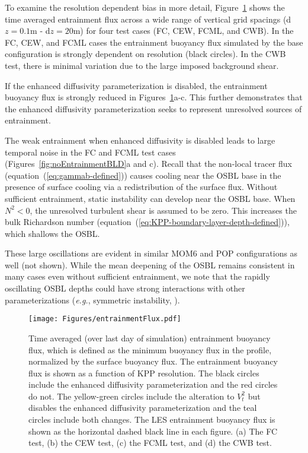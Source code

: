 \documentclass[preprint,12pt,authoryear]{agujournal}
\begin{document}
To examine the resolution dependent bias in more detail, Figure~\ref{fig:EntrainmentBuoyFlux} shows the time averaged entrainment flux across a wide range of vertical grid spacings (d$z=0.1$m - d$z=20$m) for four test cases (FC, CEW, FCML, and CWB).  In the FC, CEW, and FCML cases the entrainment buoyancy flux simulated by the base configuration is strongly dependent on resolution (black circles).  In the CWB test, there is minimal variation due to the large imposed background shear.

If the enhanced diffusivity parameterization is disabled, the entrainment buoyancy flux is strongly reduced in Figures~\ref{fig:EntrainmentBuoyFlux}a-c.  This further demonstrates that the enhanced diffusivity parameterization seeks to represent unresolved sources of entrainment.

The weak entrainment when enhanced diffusivity is disabled leads to large temporal noise in the FC and FCML test cases (Figures~\ref{fig:noEntrainmentBLD}a and c).  Recall that the non-local tracer flux (equation~(\ref{eq:gammab-defined})) causes cooling near the OSBL base in the presence of surface cooling via a redistribution of the surface flux.  Without sufficient entrainment, static instability can develop near the OSBL base.  When $N^2 < 0$, the unresolved turbulent shear is assumed to be zero.  This increases the bulk Richardson number (equation~(\ref{eq:KPP-boundary-layer-depth-defined})), which shallows the OSBL.

These large oscillations are evident in similar MOM6 and POP configurations as well (not shown).  While the mean deepening of the OSBL remains consistent in many cases even without sufficient entrainment, we note that the rapidly oscillating OSBL depths could have strong interactions with other parameterizations (\textit{e.g.}, symmetric instability, \citealp{bachman2017parameterization}).  

\begin{figure}
\centering\texttt{[image: Figures/entrainmentFlux.pdf]}
\caption{Time averaged (over last day of simulation) entrainment buoyancy flux, which is defined as the minimum buoyancy flux in the profile, normalized by the surface buoyancy flux.  The entrainment buoyancy flux is shown as a function of KPP resolution.  The black circles include the enhanced diffusivity parameterization and the red circles do not.  The yellow-green circles include the alteration to $V_t^2$ but disables the enhanced diffusivity parameterization and the teal circles include both changes.  The LES entrainment buoyancy flux is shown as the horizontal dashed black line in each figure.  (a) The FC test, (b) the CEW test, (c) the FCML test, and (d) the CWB test.}
\label{fig:EntrainmentBuoyFlux}
\end{figure}
\end{document}
